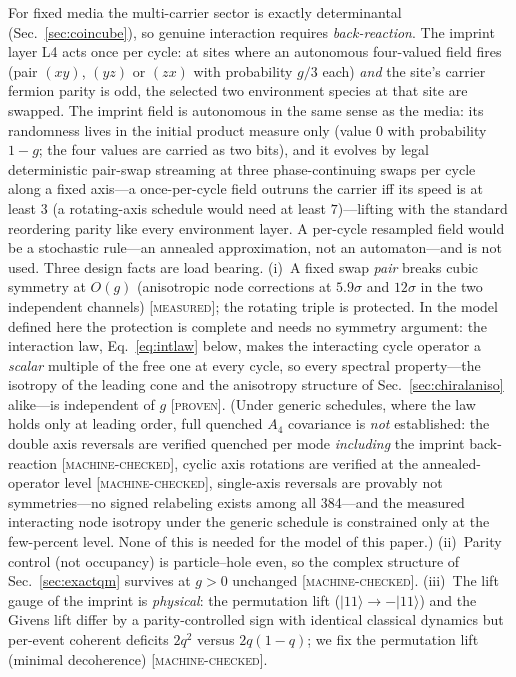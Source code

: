 \documentclass[aps,prd,twocolumn,superscriptaddress,nofootinbib,floatfix]{revtex4-2}
\newcommand{\evP}{\textnormal{\textsc{[proven]}}}
\newcommand{\evM}{\textnormal{\textsc{[machine-checked]}}}
\newcommand{\evX}{\textnormal{\textsc{[measured]}}}
\begin{document}
For fixed media the multi-carrier sector is exactly determinantal
(Sec.~\ref{sec:coincube}), so genuine interaction requires
\emph{back-reaction}. The imprint layer L4 acts once per cycle: at sites
where an autonomous four-valued field fires (pair $(xy)$, $(yz)$ or $(zx)$
with probability $g/3$ each) \emph{and} the site's carrier fermion parity
is odd, the selected two environment species at that site are swapped.
The imprint field is autonomous in the same sense as the media: its
randomness lives in the initial product measure only (value $0$ with
probability $1-g$; the four values are carried as two bits), and it
evolves by legal deterministic pair-swap streaming at three
phase-continuing swaps per cycle along a fixed axis---a once-per-cycle
field outruns the carrier iff its speed is at least $3$ (a rotating-axis
schedule would need at least $7$)---lifting with the standard reordering
parity like every environment layer. A per-cycle resampled field
would be a stochastic rule---an annealed approximation, not an
automaton---and is not used.
Three design facts are load bearing. (i)~A fixed swap \emph{pair}
breaks cubic symmetry at $O(g)$ (anisotropic node corrections at
$5.9\sigma$ and $12\sigma$ in the two independent channels) \evX{}; the
rotating triple is protected. In the model defined here the protection
is complete and needs no symmetry argument: the interaction law,
Eq.~\eqref{eq:intlaw} below, makes the interacting cycle operator a
\emph{scalar} multiple of the free one at every cycle, so every
spectral property---the isotropy of the leading cone and the anisotropy
structure of Sec.~\ref{sec:chiralaniso} alike---is independent of $g$
\evP{}. (Under generic schedules, where the law holds only at leading
order, full quenched $A_4$ covariance is \emph{not} established: the
double axis reversals are verified quenched per mode \emph{including}
the imprint back-reaction \evM{}, cyclic axis rotations are verified at
the annealed-operator level \evM{}, single-axis reversals are provably
not symmetries---no signed relabeling exists among all 384---and the
measured interacting node isotropy under the generic schedule is
constrained only at the few-percent level. None of this is needed for
the model of this paper.)
(ii)~Parity control (not occupancy) is particle--hole even, so the complex
structure of Sec.~\ref{sec:exactqm} survives at $g>0$ unchanged \evM{}.
(iii)~The lift gauge of the imprint is \emph{physical}: the permutation
lift ($|11\rangle\to-|11\rangle$) and the Givens lift differ by a
parity-controlled sign with identical classical dynamics but per-event
coherent deficits $2q^2$ versus $2q(1-q)$; we fix the permutation lift
(minimal decoherence) \evM{}.
\end{document}

